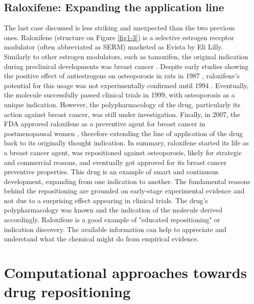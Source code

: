 \subsection{Raloxifene: Expanding the application line}

The last case discussed is less striking and unexpected than the two previous ones. Raloxifene (structure on Figure \ref{fig1-3}) is a selective estrogen receptor modulator (often abbreviated as SERM) marketed as Evista by Eli Lilly. Similarly to other estrogen modulators, such as tamoxifen, the original indication during preclinical developments was breast cancer \cite{ashburn2004drug}. Despite early studies showing the positive effect of antiestrogens on osteoporosis in rats in 1987 \citep{jordan1987effects}, raloxifene's potential for this usage was not experimentally confirmed until 1994 \citep{black1994raloxifene}. Eventually, the molecule successfully passed clinical trials in 1999, with osteoporosis as a unique indication. However, the polypharmacology of the drug, particularly its action against breast cancer, was still under investigation. Finally, in 2007, the FDA approved raloxifene as a preventive agent for breast cancer in postmenopausal women \citep{fdaraloxifen}, therefore extending the line of application of the drug back to its originally thought indication. In summary, raloxifene started its life as a breast cancer agent, was repositioned against osteoporosis, likely for strategic and commercial reasons, and eventually got approved for its breast cancer preventive properties. This drug is an example of smart and continuous development, expanding from one indication to another. The fundamental reasons behind the repositioning are grounded on early-stage experimental evidence and not due to a surprising effect appearing in clinical trials. The drug's polypharmacology was known and the indication of the molecule derived accordingly. Raloxifene is a good example of "educated repositioning" or indication discovery. The available information can help to appreciate and understand what the chemical might do from empirical evidence.

\section{Computational approaches towards drug repositioning}
\label{approaches}

